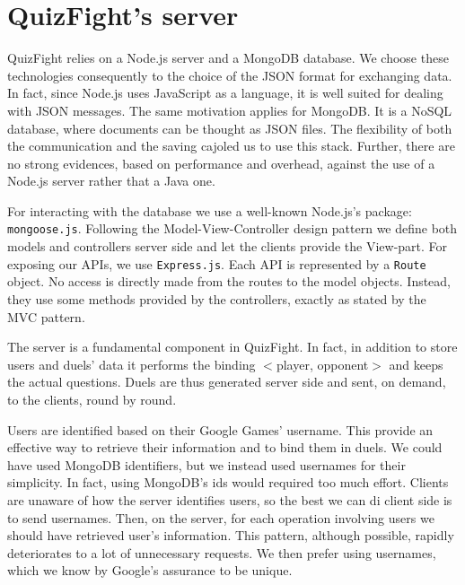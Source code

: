 \section{QuizFight's server}
QuizFight relies on a Node.js server and a MongoDB database. We choose these technologies consequently to the choice of the JSON format for exchanging data. In fact, since Node.js uses JavaScript as a language, it is well suited for dealing with JSON messages. The same motivation applies for MongoDB. It is a NoSQL database, where documents can be thought as JSON files. The flexibility of both the communication and the saving cajoled us to use this stack. Further, there are no strong evidences, based on performance and overhead, against the use of a Node.js server rather that a Java one. 

For interacting with the database we use a well-known Node.js's package: \texttt{mongoose.js}. Following the Model-View-Controller design pattern we define both models and controllers server side and let the clients provide the View-part. For exposing our APIs, we use \texttt{Express.js}. Each API is represented by a \texttt{Route} object. No access is directly made from the routes to the model objects. Instead, they use some methods provided by the controllers, exactly as stated by the MVC pattern. 

The server is a fundamental component in QuizFight. In fact, in addition to store users and duels' data it performs the binding $<$player, opponent$>$ and keeps the actual questions. Duels are thus generated server side and sent, on demand, to the clients, round by round.

Users are identified based on their Google Games' username. This provide an effective way to retrieve their information and to bind them in duels. We could have used MongoDB identifiers, but we instead used usernames for their simplicity. In fact, using MongoDB's ids would required too much effort. Clients are unaware of how the server identifies users, so the best we can di client side is to send usernames. Then, on the server, for each operation involving users we should have retrieved user's information. This pattern, although possible, rapidly deteriorates to a lot of unnecessary requests. We then prefer using usernames, which we know by Google's assurance to be unique. 

